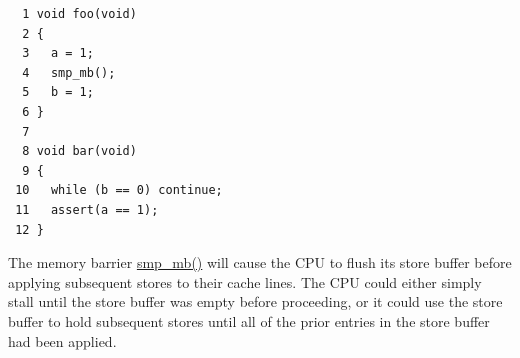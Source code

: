 \vspace{5pt}
\begin{minipage}[t]{\columnwidth}
\small
\begin{verbatim}
  1 void foo(void)
  2 {
  3   a = 1;
  4   smp_mb();
  5   b = 1;
  6 }
  7
  8 void bar(void)
  9 {
 10   while (b == 0) continue;
 11   assert(a == 1);
 12 }
\end{verbatim}
\end{minipage}
\vspace{5pt}

The memory barrier \url{smp_mb()} will cause the CPU to flush its store
buffer before applying subsequent stores to their cache lines.
The CPU could either simply stall until the store buffer was empty
before proceeding, or it could use the store buffer to hold subsequent
stores until all of the prior entries in the store buffer had been
applied.

